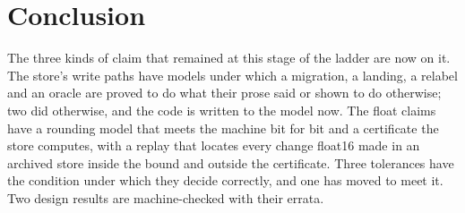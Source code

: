 \documentclass[11pt]{article}
\theoremstyle{plain}
\theoremstyle{definition}
\theoremstyle{remark}
\begin{document}
\section{Conclusion}

The three kinds of claim that remained at this stage of the ladder are now on it. The store's
write paths have models under which a migration, a landing, a relabel and an oracle are proved to
do what their prose said or shown to do otherwise; two did otherwise, and the code is written to
the model now. The float claims have a rounding model that meets the machine bit for bit and a
certificate the store computes, with a replay that locates every change float16 made in an
archived store inside the bound and outside the certificate. Three tolerances have the condition
under which they decide correctly, and one has moved to meet it. Two design results are
machine-checked with their errata.



\end{document}
